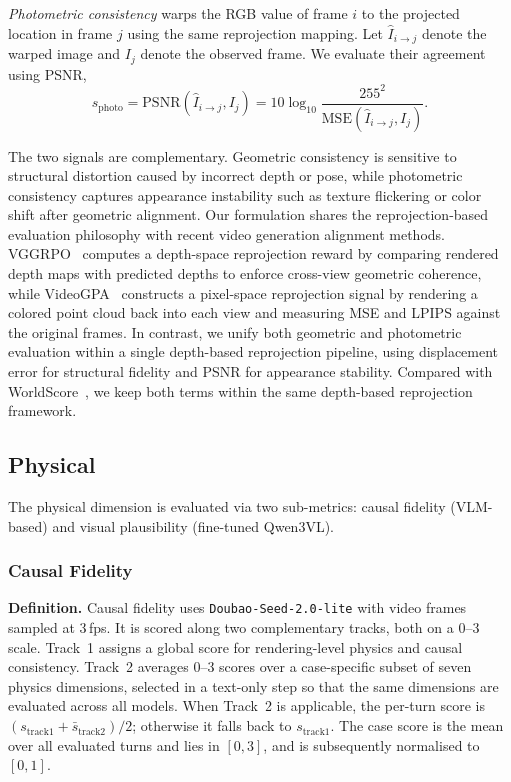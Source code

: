 \documentclass{llmxive}
\providecommand{\myparagraph}[1]{\vspace{-0.1em}\noindent\textbf{#1}\hspace{0.3em}}
\begin{document}
\emph{Photometric consistency} warps the RGB value of frame $i$ to the projected location in frame $j$ using the same reprojection mapping.
Let $\hat{I}_{i \rightarrow j}$ denote the warped image and $I_j$ denote the observed frame.
We evaluate their agreement using PSNR,
\begin{equation}
  s_{\mathrm{photo}} = \mathrm{PSNR}(\hat{I}_{i \rightarrow j}, I_j)
  = 10 \log_{10} \frac{255^2}{\mathrm{MSE}(\hat{I}_{i \rightarrow j}, I_j)}.
\end{equation}

The two signals are complementary.
Geometric consistency is sensitive to structural distortion caused by incorrect depth or pose, while photometric consistency captures appearance instability such as texture flickering or color shift after geometric alignment.
Our formulation shares the reprojection-based evaluation philosophy with recent video generation alignment methods. VGGRPO~\cite{an2026vggrpo} computes a depth-space reprojection reward by comparing rendered depth maps with predicted depths to enforce cross-view geometric coherence, while VideoGPA~\cite{du2026videogpa} constructs a pixel-space reprojection signal by rendering a colored point cloud back into each view and measuring MSE and LPIPS against the original frames. In contrast, we unify both geometric and photometric evaluation within a single depth-based reprojection pipeline, using displacement error for structural fidelity and PSNR for appearance stability.
Compared with WorldScore~\cite{duan2024worldscore}, we keep both terms within the same depth-based reprojection framework.

\subsection{Physical}
\label{app:physical_detail}

The physical dimension is evaluated via two sub-metrics: causal fidelity (VLM-based) and visual plausibility (fine-tuned Qwen3VL).

\subsubsection{Causal Fidelity}
\label{app:causal_fidelity_detail}

\myparagraph{Definition.}
Causal fidelity uses \texttt{Doubao-Seed-2.0-lite} with video frames sampled at 3\,fps.
It is scored along two complementary tracks, both on a 0--3 scale. Track~1 assigns a global score for rendering-level physics and causal consistency. Track~2 averages 0--3 scores over a case-specific subset of seven physics dimensions, selected in a text-only step so that the same dimensions are evaluated across all models. When Track~2 is applicable, the per-turn score is $(s_{\text{track1}} + \bar{s}_{\text{track2}})/2$; otherwise it falls back to $s_{\text{track1}}$. The case score is the mean over all evaluated turns and lies in $[0, 3]$, and is subsequently normalised to $[0, 1]$.
\end{document}
